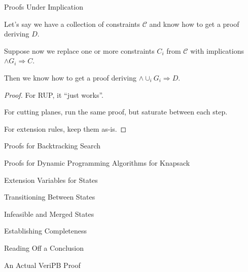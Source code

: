 \documentclass[aspectratio=169,compress,10pt]{beamer}
\begin{document}
\begin{frame}{Proofs Under Implication}
    \begin{theorem}
    Let's say we have a collection of constraints $\mathcal{C}$ and know how to get a proof deriving
        $D$. \\\medskip

    Suppose now we replace one or more constraints $C_i$ from $\mathcal{C}$ with implications $\land
        G_i \Rightarrow C$. \\\medskip

    Then we know how to get a proof deriving $\land \cup_i G_i \Rightarrow D$.
    \end{theorem}
    \begin{proof}
        For RUP, it ``just works''. \\\medskip

        For cutting planes, run the same proof, but saturate between each step. \\\medskip

        For extension rules, keep them as-is.
    \end{proof}
\end{frame}

\begin{frame}{Proofs for Backtracking Search}
\end{frame}

\begin{frame}{Proofs for Dynamic Programming Algorithms for Knapsack}
\end{frame}

\begin{frame}{Extension Variables for States}
\end{frame}

\begin{frame}{Transitioning Between States}
\end{frame}

\begin{frame}{Infeasible and Merged States}
\end{frame}

\begin{frame}{Establishing Completeness}
\end{frame}

\begin{frame}{Reading Off a Conclusion}
\end{frame}

\begin{frame}{An Actual VeriPB Proof}
\end{frame}
\end{document}
